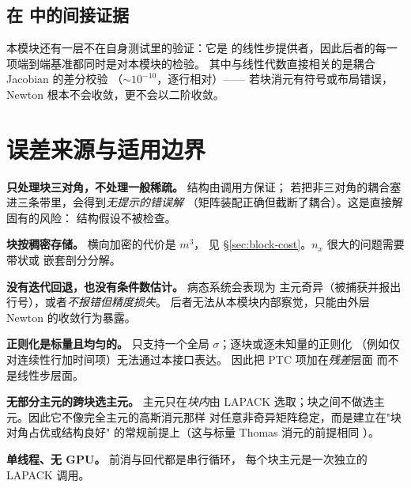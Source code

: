 \subsection{在 \texorpdfstring{}{第 11 章} 中的间接证据}

本模块还有一层不在自身测试里的验证：它是 
的线性步提供者，因此后者的每一项端到端基准都同时是对本模块的检验。
其中与线性代数直接相关的是耦合 Jacobian 的差分校验
（$\sim10^{-10}$，逐行相对）—— 若块消元有符号或布局错误，
Newton 根本不会收敛，更不会以二阶收敛。

\section{误差来源与适用边界}
\label{sec:block-limits}

\limitsheading

\begin{bounds}
  \item \textbf{只处理块三对角，不处理一般稀疏。} 结构由调用方保证；
        若把非三对角的耦合塞进三条带里，会得到\emph{无提示的错误解}
        （矩阵装配正确但截断了耦合）。这是直接解固有的风险：
        结构假设不被检查。

  \item \textbf{块按稠密存储。} 横向加密的代价是 $m^{3}$，
        见 \S\ref{sec:block-cost}。$n_x$ 很大的问题需要带状或
        嵌套剖分分解。

  \item \textbf{没有迭代回退，也没有条件数估计。} 病态系统会表现为
        主元奇异（被捕获并报出行号），或者\emph{不报错但精度损失}。
        后者无法从本模块内部察觉，只能由外层 Newton 的收敛行为暴露。

  \item \textbf{正则化是标量且均匀的。} 
        只支持一个全局 $\sigma$；逐块或逐未知量的正则化
        （例如仅对连续性行加时间项）无法通过本接口表达。
         因此把 PTC 项加在\emph{残差}层面
        而不是线性步层面。

  \item \textbf{无部分主元的跨块选主元。} 主元只在\emph{块内}由 LAPACK
        选取；块之间不做选主元。因此它不像完全主元的高斯消元那样
        对任意非奇异矩阵稳定，而是建立在"块对角占优或结构良好"
        的常规前提上（这与标量 Thomas 消元的前提相同 \cite{golub2013}）。

  \item \textbf{单线程、无 GPU。} 前消与回代都是串行循环，
        每个块主元是一次独立的 LAPACK 调用。
\end{bounds}


